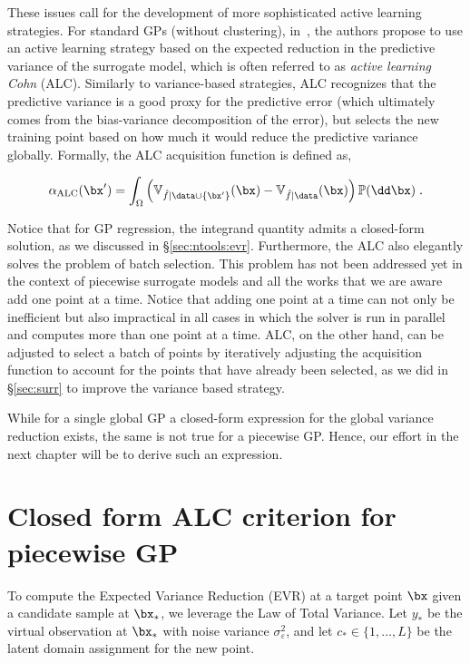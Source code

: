 \smallskip
These issues call for the development of more sophisticated active learning strategies. For standard GPs (without clustering), in~\cite{cohn1996}, the authors propose to use an active learning strategy based on the expected reduction in the predictive variance of the surrogate model, which is often referred to as \textit{active learning Cohn} (ALC). Similarly to variance-based strategies, ALC recognizes that the predictive variance is a good proxy for the predictive error (which ultimately comes from the bias-variance decomposition of the error), but selects the new training point based on how much it would reduce the predictive variance globally. Formally, the ALC acquisition function is defined as,


\begin{equation}
    \alpha_{\text{ALC}}(\bx^\prime) = \int_{\Omega} \left( \mathbb{V}_{\hat{f} \mid \data \cup \{\bx^\prime\}}(\bx) - \mathbb{V}_{\hat{f} \mid \data}(\bx) \right) \mathbb{P}(\dd \bx) \;.
\end{equation}

Notice that for GP regression, the integrand quantity admits a closed-form solution, as we discussed in \S\ref{sec:ntools:evr}. Furthermore, the ALC also elegantly solves the problem of batch selection. This problem has not been addressed yet in the context of piecewise surrogate models and all the works that we are aware add one point at a time. Notice that adding one point at a time can not only be inefficient but also impractical in all cases in which the solver is run in parallel and computes more than one point at a time. ALC, on the other hand, can be adjusted to select a batch of points by iteratively adjusting the acquisition function to account for the points that have already been selected, as we did in \S\ref{sec:surr} to improve the variance based strategy.

\smallskip
While for a single global GP a closed-form expression for the global variance reduction exists, the same is not true for a piecewise GP. Hence, our effort in the next chapter will be to derive such an expression.

\section{Closed form ALC criterion for piecewise GP}
\label{sec:al:alc}

To compute the Expected Variance Reduction (EVR) at a target point $\bx$ given a candidate sample at $\bx_*$, we leverage the Law of Total Variance. Let $y_*$ be the virtual observation at $\bx_*$ with noise variance $\sigma_\varepsilon^2$, and let $c_* \in \{1, \dots, L\}$ be the latent domain assignment for the new point. 

